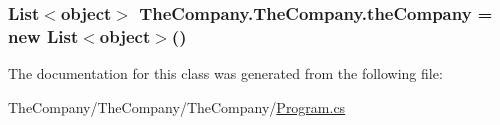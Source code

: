 \subsubsection[{the\+Company}]{\setlength{\rightskip}{0pt plus 5cm}List$<$object$>$ The\+Company.\+The\+Company.\+the\+Company = new List$<$object$>$()\hspace{0.3cm}{\ttfamily [private]}}\label{class_the_company_1_1_the_company_a0ba467626e493f40955c5c9b0bac879c}


The documentation for this class was generated from the following file\+:\begin{DoxyCompactItemize}
\item 
The\+Company/\+The\+Company/\+The\+Company/\hyperlink{_program_8cs}{Program.\+cs}\end{DoxyCompactItemize}
